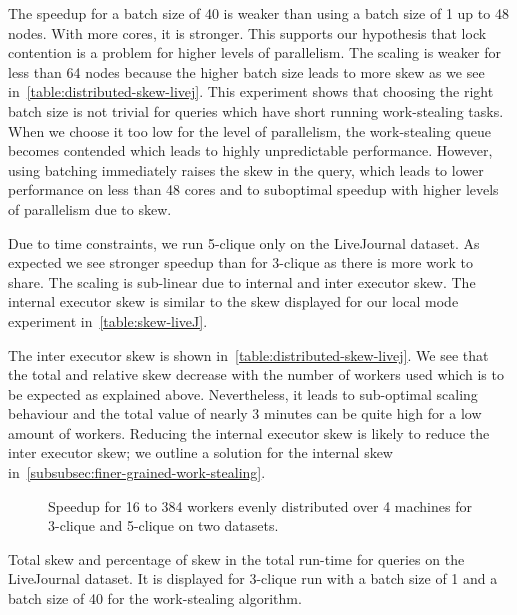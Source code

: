 The speedup for a batch size of 40 is weaker than using a batch size of 1 up to 48 nodes.
With more cores, it is stronger.
This supports our hypothesis that lock contention is a problem for higher levels of parallelism.
The scaling is weaker for less than 64 nodes because the higher batch size leads to more skew as we see
in~\cref{table:distributed-skew-livej}.
This experiment shows that choosing the right batch size is not trivial for queries which have
short running work-stealing tasks.
When we choose it too low for the level of parallelism, the work-stealing queue becomes contended which leads
to highly unpredictable performance.
However, using batching immediately raises the skew in the query, which leads to lower performance on less
than 48 cores and to suboptimal speedup with higher levels of parallelism due to skew.

Due to time constraints, we run 5-clique only on the LiveJournal dataset.
As expected we see stronger speedup than for 3-clique as there is more work to share.
The scaling is sub-linear due to internal and inter executor skew.
The internal executor skew is similar to the skew displayed for our local mode experiment in~\cref{table:skew-liveJ}.

The inter executor skew is shown in~\cref{table:distributed-skew-livej}.
We see that the total and relative skew decrease with the number of workers used which is to be
expected as explained above.
Nevertheless, it leads to sub-optimal scaling behaviour and the total value of nearly 3 minutes
can be quite high for a low amount of workers.
Reducing the internal executor skew is likely to reduce the inter executor skew;
we outline a solution for the internal skew in~\cref{subsubsec:finer-grained-work-stealing}.

\begin{figure}
    \subfloat[LiveJournal]{}
    \subfloat[Orkut]{}
    \caption{Speedup for 16 to 384 workers evenly distributed over 4 machines for
    3-clique and 5-clique on two datasets.
    }
    \label{fig:distributed-scaling}
\end{figure}

\begin{table}
    \centering
    \resizebox{\textwidth}{!}{%
    
    }
    \caption{Total skew and percentage of skew in the total run-time for queries on the LiveJournal dataset.
    It is displayed for 3-clique run with a batch size of 1 and a batch size of 40 for the work-stealing
    algorithm.
    }
    \label{table:distributed-skew-livej}
\end{table}

